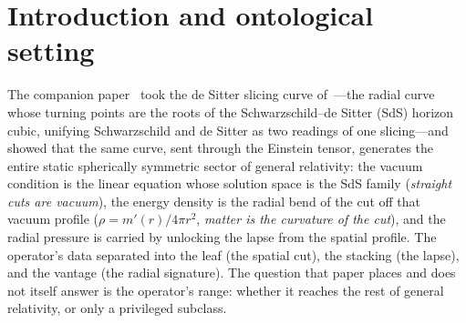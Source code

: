 \documentclass[11pt,a4paper]{article}
\theoremstyle{definition}
\begin{document}
\section{Introduction and ontological setting}\label{sec:intro}

The companion paper~\cite{JanzenOperator} took the de Sitter slicing curve of~\cite{JanzenSlicing}---the radial curve whose turning points are the roots of the Schwarzschild--de Sitter (SdS) horizon cubic, unifying Schwarzschild and de Sitter as two readings of one slicing---and showed that the same curve, sent through the Einstein tensor, generates the entire static spherically symmetric sector of general relativity: the vacuum condition is the linear equation whose solution space is the SdS family (\emph{straight cuts are vacuum}), the energy density is the radial bend of the cut off that vacuum profile ($\rho=m'(r)/4\pi r^{2}$, \emph{matter is the curvature of the cut}), and the radial pressure is carried by unlocking the lapse from the spatial profile. The operator's data separated into the leaf (the spatial cut), the stacking (the lapse), and the vantage (the radial signature). The question that paper places and does not itself answer is the operator's range: whether it reaches the rest of general relativity, or only a privileged subclass.
\end{document}
